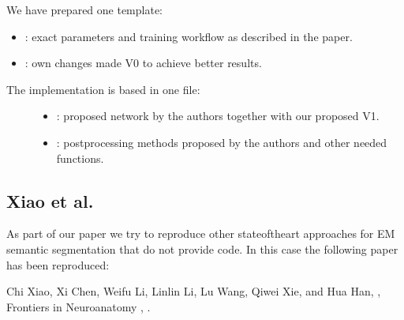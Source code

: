 \documentclass[letterpaper,10pt,english]{sphinxmanual}
\begin{document}
We have prepared one template:
\begin{itemize}
\item {} 
 : exact parameters and training workflow as described in the paper.

\item {} 
 : own changes made V0 to achieve better results.

\end{itemize}
\begin{description}
\item[{The implementation is based in one file:}] \leavevmode\begin{itemize}
\item {} 
 : proposed network by the authors together with our proposed V1.

\item {} 
 : post\sphinxhyphen{}processing methods proposed by the authors and other needed functions.

\end{itemize}

\end{description}


\subsection{Xiao et al.}
\label{\detokenize{sota_implementations/xiao_2018/xiao:xiao-et-al}}\label{\detokenize{sota_implementations/xiao_2018/xiao::doc}}
As part of our paper we try to reproduce other state\sphinxhyphen{}of\sphinxhyphen{}the\sphinxhyphen{}art approaches for EM semantic segmentation
that do not provide code. In this case the following paper has been reproduced:

\begin{sphinxVerbatim}[commandchars=\\\{\}]
Chi Xiao, Xi Chen, Weifu Li, Linlin Li, Lu Wang, Qiwei Xie, and Hua Han, 
,
Frontiers in Neuroanatomy  , .
\end{sphinxVerbatim}
\end{document}
